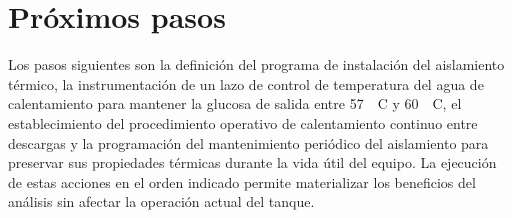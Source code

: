 \documentclass[11pt,a4paper]{article}
\begin{document}
\section{Próximos pasos}

Los pasos siguientes son la definición del programa de instalación del aislamiento térmico, la instrumentación de un lazo de control de temperatura del agua de calentamiento para mantener la glucosa de salida entre 57~~\textdegree C y 60~~\textdegree C, el establecimiento del procedimiento operativo de calentamiento continuo entre descargas y la programación del mantenimiento periódico del aislamiento para preservar sus propiedades térmicas durante la vida útil del equipo. La ejecución de estas acciones en el orden indicado permite materializar los beneficios del análisis sin afectar la operación actual del tanque.
\end{document}

